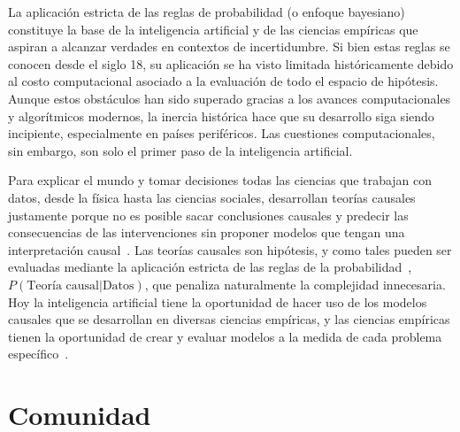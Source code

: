 \documentclass[a4paper,11pt]{book}
\theoremstyle{definition}
\begin{document}
La aplicaci\'on estricta de las reglas de probabilidad (o enfoque bayesiano) constituye la base de la inteligencia artificial y de las ciencias emp\'iricas que aspiran a alcanzar verdades en contextos de incertidumbre.
%
Si bien estas reglas se conocen desde el siglo 18, su aplicaci\'on se ha visto limitada hist\'oricamente debido al costo computacional asociado a la evaluaci\'on de todo el espacio de hip\'otesis.
%
Aunque estos obst\'aculos han sido superado gracias a los avances computacionales y algor\'itmicos modernos, la inercia hist\'orica hace que su desarrollo siga siendo incipiente, especialmente en pa\'ises perif\'ericos.
%
Las cuestiones computacionales, sin embargo, son solo el primer paso de la inteligencia artificial.

%

Para explicar el mundo y tomar decisiones todas las ciencias que trabajan con datos, desde la f\'isica hasta las ciencias sociales, desarrollan teor\'ias causales justamente porque no es posible sacar conclusiones causales y predecir las consecuencias de las intervenciones sin proponer modelos que tengan una interpretaci\'on causal~\cite{pearl2009-causality, peters2017-causalInference}.
%
Las teor\'ias causales son hip\'otesis, y como tales pueden ser evaluadas mediante la aplicaci\'on estricta de las reglas de la probabilidad~\cite{winn2012-causality}, $P(\text{Teor\'ia causal}|\text{Datos})$, que penaliza naturalmente la complejidad innecesaria.
%
Hoy la inteligencia artificial tiene la oportunidad de hacer uso de los modelos causales que se desarrollan en diversas ciencias emp\'iricas, y las ciencias emp\'iricas tienen la oportunidad de crear y evaluar modelos a la medida de cada problema espec\'ifico~\cite{murphy-pmlBook1,murphy-pmlBook2, Bishop2013, Bishop2006}.


\section{Comunidad}
\end{document}
